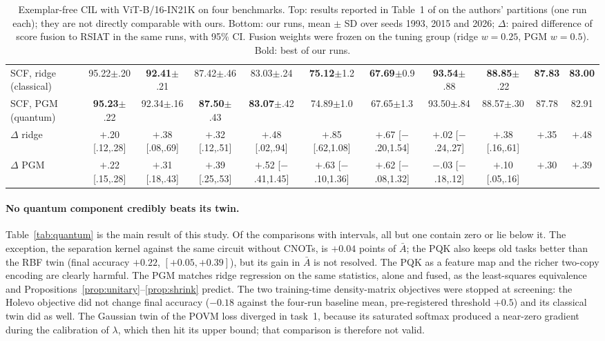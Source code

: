 \begin{table}[t]
{\begin{tabular}{lcccccccccc}
SCF, ridge (classical) & 95.22{\tiny$\pm$.20} & \textbf{92.41}{\tiny$\pm$.21} & 87.42{\tiny$\pm$.46} & 83.03{\tiny$\pm$.24}
 & \textbf{75.12}{\tiny$\pm$1.2} & \textbf{67.69}{\tiny$\pm$0.9} & \textbf{93.54}{\tiny$\pm$.88} & \textbf{88.85}{\tiny$\pm$.22} & \textbf{87.83} & \textbf{83.00} \\
SCF, PGM (quantum) & \textbf{95.23}{\tiny$\pm$.22} & 92.34{\tiny$\pm$.16} & \textbf{87.50}{\tiny$\pm$.43} & \textbf{83.07}{\tiny$\pm$.42}
 & 74.89{\tiny$\pm$1.0} & 67.65{\tiny$\pm$1.3} & 93.50{\tiny$\pm$.84} & 88.57{\tiny$\pm$.30} & 87.78 & 82.91 \\
\midrule
$\Delta$ ridge & $+$.20 {\tiny[.12,.28]} & $+$.38 {\tiny[.08,.69]} & $+$.32 {\tiny[.12,.51]} & $+$.48 {\tiny[.02,.94]}
 & $+$.85 {\tiny[.62,1.08]} & $+$.67 {\tiny[$-$.20,1.54]} & $+$.02 {\tiny[$-$.24,.27]} & $+$.38 {\tiny[.16,.61]} & $+$.35 & $+$.48 \\
$\Delta$ PGM & $+$.22 {\tiny[.15,.28]} & $+$.31 {\tiny[.18,.43]} & $+$.39 {\tiny[.25,.53]} & $+$.52 {\tiny[$-$.41,1.45]}
 & $+$.63 {\tiny[$-$.10,1.36]} & $+$.62 {\tiny[$-$.08,1.32]} & $-$.03 {\tiny[$-$.18,.12]} & $+$.10 {\tiny[.05,.16]} & $+$.30 & $+$.39 \\
\bottomrule
\end{tabular}}
\caption{Exemplar-free CIL with ViT-B/16-IN21K on four benchmarks. Top: results
reported in Table~1 of \citet{rsiat} on the authors' partitions (one run each);
they are not directly comparable with ours. Bottom: our runs, mean $\pm$ SD over
seeds 1993, 2015 and 2026; $\Delta$: paired difference of score fusion to RSIAT
in the same runs, with 95\% CI. Fusion weights were frozen on the tuning group
(ridge $w=0.25$, PGM $w=0.5$). Bold: best of our runs.}
\label{tab:main}
\end{table}

\paragraph{No quantum component credibly beats its twin.}
Table~\ref{tab:quantum} is the main result of this study. Of the comparisons
with intervals, all but one contain zero or lie below it. The exception, the
separation kernel against the same circuit without CNOTs, is $+0.04$ points of
$\bar A$; the PQK also keeps old tasks better than the RBF twin (final accuracy
$+0.22$, $[+0.05,+0.39]$), but its gain in $\bar A$ is not resolved. The PQK as
a feature map and the richer two-copy encoding are clearly harmful. The PGM
matches ridge regression on the same statistics, alone and fused, as the
least-squares equivalence and Propositions~\ref{prop:unitary}--\ref{prop:shrink}
predict. The two training-time density-matrix objectives were stopped at
screening: the Holevo objective did not change final accuracy ($-0.18$ against
the four-run baseline mean, pre-registered threshold $+0.5$) and its classical
twin did as well. The Gaussian twin of the POVM loss diverged in task~1,
because its saturated softmax produced a near-zero gradient during the
calibration of $\lambda$, which then hit its upper bound; that comparison is
therefore not valid.

